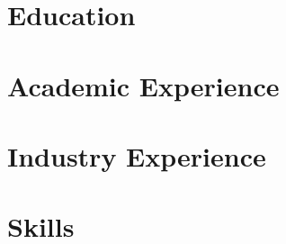 \documentclass[12pt]{article}
\begin{document}
    \section{Education}
    

    \section{Academic Experience}
    

    \section{Industry Experience}
    

    \section{Skills}
    
\end{document}
